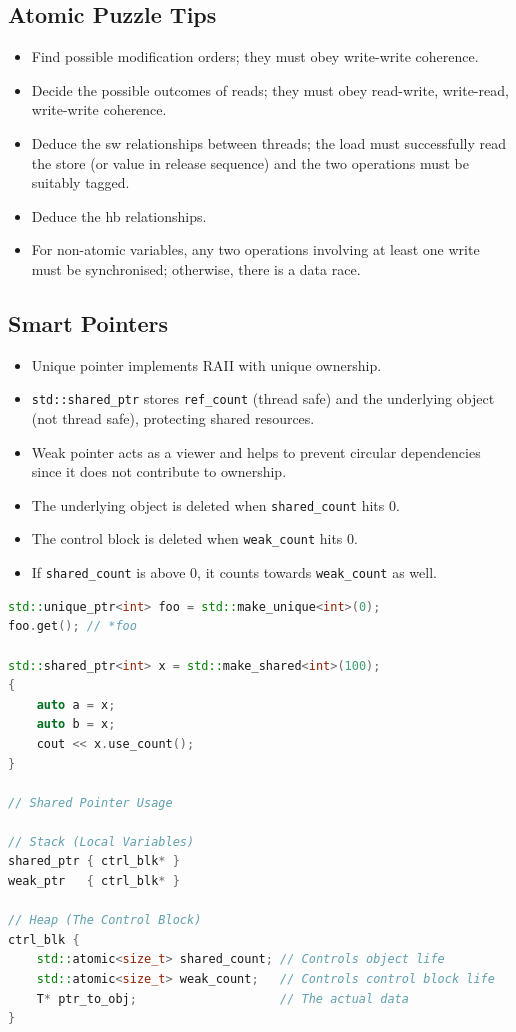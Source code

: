 \documentclass{article}
\begin{document}
\subsection{Atomic Puzzle Tips}
\begin{itemize}
    \item Find possible modification orders; they must obey write-write coherence.
    \item Decide the possible outcomes of reads; they must obey read-write, write-read, write-write coherence.
    \item Deduce the sw relationships between threads; the load must successfully read the store (or value in release sequence) and the two operations must be suitably tagged.
    \item Deduce the hb relationships.
    \item For non-atomic variables, any two operations involving at least one write must be synchronised; otherwise, there is a data race.
\end{itemize}

\subsection{Smart Pointers}
\begin{itemize}
    \item Unique pointer implements RAII with unique ownership. 
    \item \verb|std::shared_ptr| stores \verb|ref_count| (thread safe) and the underlying object (not thread safe), protecting shared resources.
    \item Weak pointer acts as a viewer and helps to prevent circular dependencies since it does not contribute to ownership.
    \item The underlying object is deleted when \verb|shared_count| hits 0.
    \item The control block is deleted when \verb|weak_count| hits 0.
    \item If \verb|shared_count| is above 0, it counts towards \verb|weak_count| as well.
\end{itemize}

\begin{lstlisting}[language=C++]
std::unique_ptr<int> foo = std::make_unique<int>(0);
foo.get(); // *foo

std::shared_ptr<int> x = std::make_shared<int>(100);
{
    auto a = x;
    auto b = x;
    cout << x.use_count();
}

// Shared Pointer Usage

// Stack (Local Variables)
shared_ptr { ctrl_blk* }
weak_ptr   { ctrl_blk* }

// Heap (The Control Block)
ctrl_blk {
    std::atomic<size_t> shared_count; // Controls object life
    std::atomic<size_t> weak_count;   // Controls control block life
    T* ptr_to_obj;                    // The actual data
}
\end{lstlisting}
\end{document}

